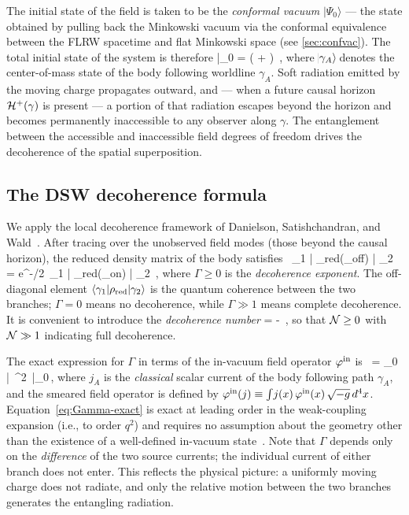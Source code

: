 The initial state of the field is taken to be the \emph{conformal vacuum}
$|\Psi_0\rangle$ — the state obtained by pulling back the Minkowski vacuum via
the conformal equivalence between the FLRW spacetime and flat Minkowski space
(see \cref{sec:confvac}).  The total initial state of the system is therefore
\be
  |\Phi_0\rangle
  =
  \lb( + \rb) \otimes {} \,,
  \label{eq:initial-state}
\ee
where $\!\ket{\gamma_A}\!$ denotes the center-of-mass state of the body following
worldline $\gamma_A$.  Soft radiation emitted by the moving charge propagates
outward, and — when a future causal horizon $\mathcal{H}^+(\gamma)$ is present —
a portion of that radiation escapes beyond the horizon and becomes permanently
inaccessible to any observer along $\gamma$.  The entanglement between the
accessible and inaccessible field degrees of freedom drives the decoherence
of the spatial superposition.


\subsection{The DSW decoherence formula}
\label{sec:deco-formula}

We apply the local decoherence framework of Danielson, Satishchandran, and
Wald~\cite{DSW2022,DSW2023,DSW2025a}.  After tracing over the unobserved field
modes (those beyond the causal horizon), the reduced density matrix of the
body satisfies~\cite{DSW2025a}
\be
  \langle \gamma_1 | \rho_{\rm red}(\tau_{\rm off}) | \gamma_2 \rangle
  =
  e^{-\Gamma/2}\,
  \langle \gamma_1 | \rho_{\rm red}(\tau_{\rm on}) | \gamma_2 \rangle \,,
  \label{eq:rho-off-diag}
\ee
where $\Gamma \geq 0$ is the \emph{decoherence exponent}.  The off-diagonal element
$\langle \gamma_1 | \rho_{\rm red} | \gamma_2 \rangle$ is the quantum coherence
between the two branches; $\Gamma = 0$ means no decoherence, while
$\Gamma \gg 1$ means complete decoherence.  It is convenient to introduce the
\emph{decoherence number}
\be
  \Nnum \equiv {}
  = -\ln{} \,,
  \label{eq:Ndef}
\ee
so that $\mathcal{N} \geq 0$ with $\mathcal{N} \gg 1$ indicating full decoherence.

The exact expression for $\Gamma$ in terms of the in-vacuum field
operator $\varphi^{\mathrm{in}}$ is~\cite{DSW2025a}
\be
  \Gamma
  =
  \langle \Psi_0 |\,
    ^2
  \,|\Psi_0\rangle \,,
  \label{eq:Gamma-exact}
\ee
where $j_A$ is the \emph{classical} scalar current of the body following
path $\gamma_A$, and the smeared field operator is defined by
$\varphi^{\mathrm{in}}(j) \equiv \int \! j(x)\, \varphi^{\mathrm{in}}(x)\, \sqrt{-g}\, d^4x$.
Equation~\eqref{eq:Gamma-exact} is exact at leading order in the weak-coupling
expansion (i.e., to order $q^2$) and requires no assumption about the geometry
other than the existence of a well-defined in-vacuum state~\cite{DSW2025a}.
Note that $\Gamma$ depends only on the \emph{difference} of the two source currents;
the individual current of either branch does not enter.  This reflects the physical
picture: a uniformly moving charge does not radiate, and only the relative motion
between the two branches generates the entangling radiation.

